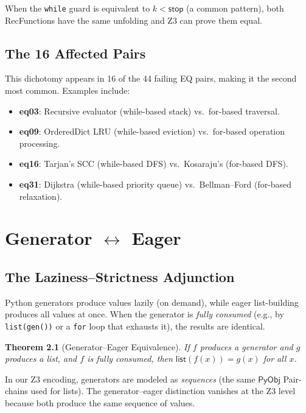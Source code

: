 \documentclass[11pt,a4paper]{report}
\theoremstyle{definition}
\theoremstyle{plain}
\newtheorem{theorem}[definition]{Theorem}
\newcommand{\PyObj}{\mathsf{PyObj}}
\begin{document}
When the \texttt{while} guard is equivalent to $k < \mathsf{stop}$
(a common pattern), both RecFunctions have the same unfolding and Z3
can prove them equal.

\section{The 16 Affected Pairs}

This dichotomy appears in 16 of the 44 failing EQ pairs, making it
the second most common.  Examples include:
\begin{itemize}
  \item \textbf{eq03}: Recursive evaluator (while-based stack) vs.\
    for-based traversal.
  \item \textbf{eq09}: OrderedDict LRU (while-based eviction) vs.\
    for-based operation processing.
  \item \textbf{eq16}: Tarjan's SCC (while-based DFS) vs.\ Kosaraju's
    (for-based DFS).
  \item \textbf{eq31}: Dijkstra (while-based priority queue) vs.\
    Bellman--Ford (for-based relaxation).
\end{itemize}


\chapter{Generator $\leftrightarrow$ Eager}
\label{ch:gen-eager}

\section{The Laziness--Strictness Adjunction}

Python generators produce values lazily (on demand), while eager
list-building produces all values at once.  When the generator is
\emph{fully consumed} (e.g., by \texttt{list(gen())} or a
\texttt{for} loop that exhausts it), the results are identical.

\begin{theorem}[Generator--Eager Equivalence]
If $f$ produces a generator and $g$ produces a list, and $f$ is
fully consumed, then $\mathsf{list}(f(x)) = g(x)$ for all $x$.
\end{theorem}

In our Z3 encoding, generators are modeled as \emph{sequences} (the
same $\PyObj$ Pair-chains used for lists).  The generator--eager
distinction vanishes at the Z3 level because both produce the same
sequence of values.
\end{document}

